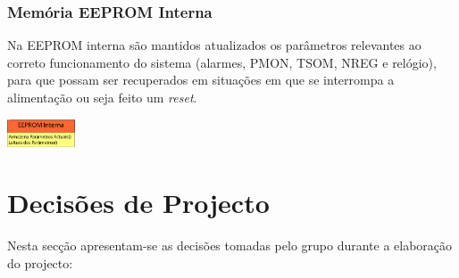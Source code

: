 \documentclass{article}
\begin{document}
		\subsubsection{Memória EEPROM Interna}
		Na EEPROM interna são mantidos atualizados os parâmetros relevantes ao correto funcionamento do sistema (alarmes, PMON, TSOM, NREG e relógio), para que possam ser recuperados em situações em que se interrompa a alimentação ou seja feito um \textit{reset}.
		
	
		\begin{center}
			\includegraphics[width=0.15\textwidth]{scereport_14}
		\end{center}
		
		\section{Decisões de Projecto}
		Nesta secção apresentam-se as decisões tomadas pelo grupo durante a elaboração do projecto:
		
\end{document}
